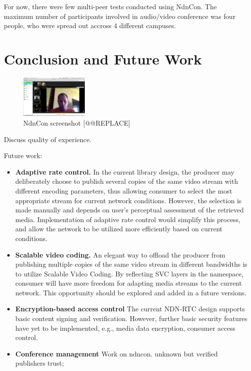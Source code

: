 \documentclass{icn/sig-alternate-2012} %
\newcommand{\ndnrtcName}{NDN-RTC} %
\newcommand{\ndnconName}{NdnCon}
\begin{document}
For now, there were few multi-peer tests conducted using NdnCon. The maximum number of participants involved in audio/video conference was four people, who were spread out accross 4 different campuses.

\section{Conclusion and Future Work}
\label{sec:conclusion}


\begin{figure}[t!]
\centering
\includegraphics[width=0.3\textwidth]{ndncon}
\caption{\ndnconName{} screenshot [@@REPLACE]}
\label{fig:ndncon}
\end{figure}


Discuss quality of experience. 

Future work: 
\begin{itemize}[label={}]
\item \textbf{Adaptive rate control.} In the current library design, the producer may deliberately choose to publish several copies of the same video stream with different encoding parameters, thus allowing consumer to select the most appropriate stream for current network conditions. However, the selection is made manually and depends on user's perceptual assessment of the retrieved media. Implementation of adaptive rate control would simplify this process, and allow the network to be utilized more efficiently based on current conditions.

\item \textbf{Scalable video coding.} An elegant way to offload the producer from publishing multiple copies of the same video stream in different bandwidths is to utilize Scalable Video Coding. By reflecting SVC layers in the namespace, consumer will have more freedom for adapting media streams to the current network. This opportunity should be explored and added in a future versions.

\item \textbf{Encryption-based access control} The current \ndnrtcName{} design supports basic content signing and verification. However, further basic security features have yet to be implemented, e.g., media data encryption, consumer access control.

\item \textbf{Conference management} 
Work on ndncon. unknown but verified publishers trust; 
\end{itemize}
\end{document}
